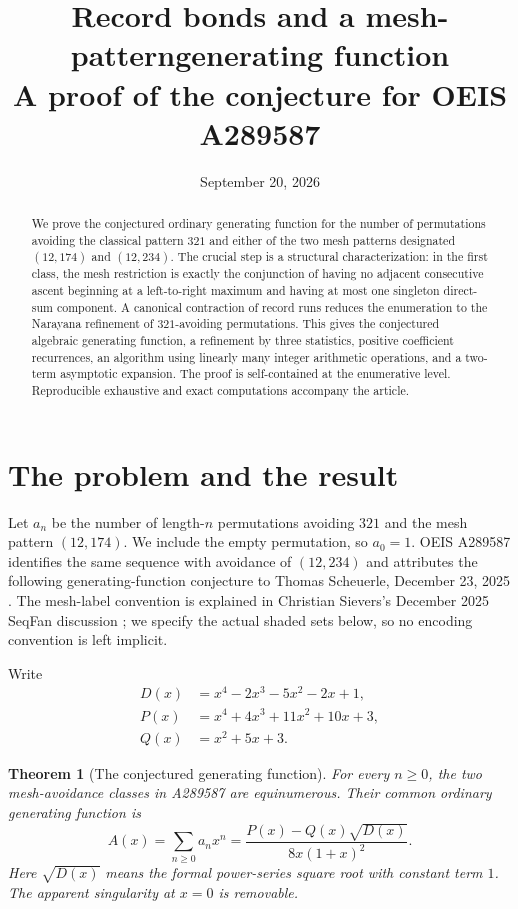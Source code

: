 \documentclass[11pt,a4paper]{article}
\title{\textbf{Record bonds and a mesh-pattern\newline generating function}\\[5pt]
\large A proof of the conjecture for OEIS A289587}
\author{}
\date{September 20, 2026}
\newtheorem{theorem}{Theorem}[section]
\theoremstyle{definition}
\theoremstyle{remark}
\begin{document}
\maketitle
\vspace{-1.5em}
\begin{abstract}
We prove the conjectured ordinary generating function for the number of
permutations avoiding the classical pattern $321$ and either of the two
mesh patterns designated $(12,174)$ and $(12,234)$. The crucial step is a
structural characterization: in the first class, the mesh restriction is
exactly the conjunction of having no adjacent consecutive ascent beginning
at a left-to-right maximum and having at most one singleton direct-sum
component. A canonical contraction of record runs reduces the enumeration
to the Narayana refinement of $321$-avoiding permutations. This gives the
conjectured algebraic generating function, a refinement by three statistics,
positive coefficient recurrences, an algorithm using linearly many integer
arithmetic operations, and a two-term asymptotic expansion. The proof is
self-contained at the enumerative level. Reproducible exhaustive and exact
computations accompany the article.
\end{abstract}
\tableofcontents
\newpage

\section{The problem and the result}

Let $a_n$ be the number of length-$n$ permutations avoiding $321$ and the
mesh pattern $(12,174)$. We include the empty permutation, so $a_0=1$.
OEIS A289587 identifies the same sequence with avoidance of $(12,234)$ and
attributes the following generating-function conjecture to Thomas Scheuerle,
December 23, 2025 \cite{oeis}. The mesh-label convention is explained in
Christian Sievers's December 2025 SeqFan discussion \cite{seqfan}; we specify
the actual shaded sets below, so no encoding convention is left implicit.

Write
\begin{align}
 D(x)&=x^4-2x^3-5x^2-2x+1,\label{eq:D}\\
 P(x)&=x^4+4x^3+11x^2+10x+3,\label{eq:P}\\
 Q(x)&=x^2+5x+3.\label{eq:Q}
\end{align}

\begin{theorem}[The conjectured generating function]\label{thm:main}
For every $n\geq 0$, the two mesh-avoidance classes in A289587 are equinumerous.
Their common ordinary generating function is
\begin{equation}\label{eq:main}
 \boxed{\displaystyle
 A(x)=\sum_{n\geq0}a_nx^n
 =\frac{P(x)-Q(x)\sqrt{D(x)}}{8x(1+x)^2}.}
\end{equation}
Here $\sqrt{D(x)}$ means the formal power-series square root with constant
term $1$. The apparent singularity at $x=0$ is removable.
\end{theorem}
\end{document}
